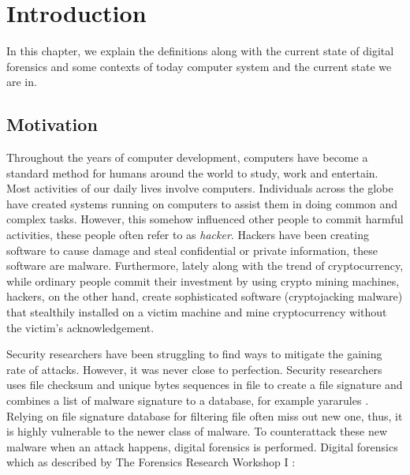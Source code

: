 \chapter[Introduction]{Introduction}

In this chapter, we explain the definitions along with the current state of digital forensics and some contexts of today computer system and the current state we are in.

\section[Motivation]{Motivation}

Throughout the years of computer development, computers have become a standard method for humans around the world to study, work and entertain. Most activities of our daily lives involve computers. Individuals across the globe have created systems running on computers to assist them in doing common and complex tasks. However, this somehow influenced other people to commit harmful activities, these people often refer to as \textit{hacker}. Hackers have been creating software to cause damage and steal confidential or private information, these software are malware. Furthermore, lately along with the trend of cryptocurrency, while ordinary people commit their investment by using crypto mining machines, hackers, on the other hand, create sophisticated software (cryptojacking malware) that stealthily installed on a victim machine and mine cryptocurrency without the victim's acknowledgement.

Security researchers have been struggling to find ways to mitigate the gaining rate of attacks. However, it was never close to perfection. Security researchers uses file checksum and unique bytes sequences in file to create a file signature and combines a list of malware signature to a database, for example yararules \cite{yararules}. Relying on file signature database for filtering file often miss out new one, thus, it is highly vulnerable to the newer class of malware. To counterattack these new malware when an attack happens, digital forensics is performed. Digital forensics which as described by The Forensics Research Workshop I \cite{roadmap}:


